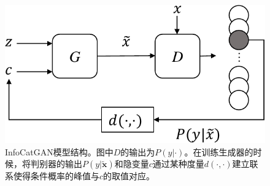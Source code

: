 \begin{figure}[htbp]
  \centering
  \includegraphics[width=\onef\textwidth]{Img/icg-arch.pdf} 
  \caption{InfoCatGAN模型结构。图中$D$的输出为$P(y|\cdot)$。在训练生成器的时候，将判别器的输出$P(y|\tilde{\mathbf{x}})$和隐变量$c$通过某种度量$d(\cdot, \cdot)$建立联系使得条件概率的峰值与$c$的取值对应。}
  \label{fig:icg-arch}
\end{figure}

